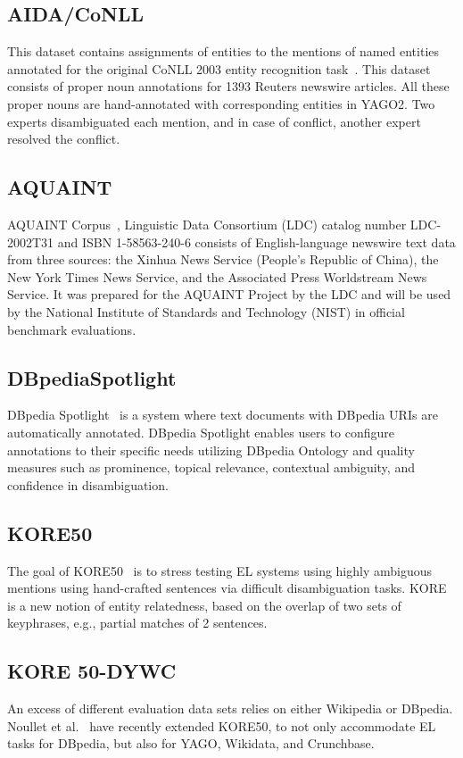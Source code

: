 \documentclass{article}
\begin{document}
\subsection{AIDA/CoNLL}
This dataset contains assignments of entities to the mentions of named entities annotated for the original CoNLL 2003 entity recognition task~\cite{hoffart2011robust}. This dataset consists of proper noun annotations for 1393 Reuters newswire articles. All these proper nouns are hand-annotated with corresponding entities in YAGO2. Two experts disambiguated each mention, and in case of conflict, another expert resolved the conflict.

\subsection{AQUAINT}
AQUAINT Corpus~\cite{crouch2005aquaint}, Linguistic Data Consortium (LDC) catalog number LDC- 2002T31 and ISBN 1-58563-240-6 consists of English-language newswire text data from three sources: the Xinhua News Service (People's Republic of China), the New York Times News Service, and the Associated Press Worldstream News Service. It was prepared for the AQUAINT Project by the LDC and will be used by the National Institute of Standards and Technology (NIST) in official benchmark evaluations.

\subsection{DBpediaSpotlight}
DBpedia Spotlight~\cite{mendes2011dbpedia} is a system where text documents with DBpedia URIs are automatically annotated. DBpedia Spotlight enables users to configure annotations to their specific needs utilizing DBpedia Ontology and quality measures such as prominence, topical relevance, contextual ambiguity, and confidence in disambiguation.

\subsection{KORE50}
The goal of KORE50~\cite{hoffart2012kore} is to stress testing EL systems using highly ambiguous mentions using hand-crafted sentences via difficult disambiguation tasks.
KORE is a new notion of entity relatedness, based on the overlap of two sets of keyphrases, e.g., partial matches of 2 sentences.

\subsection{KORE 50-DYWC}
An excess of different evaluation data sets relies on either Wikipedia or DBpedia. Noullet et al.~\cite{noullet2020kore} have recently extended KORE50, to not only accommodate EL tasks for DBpedia, but also for YAGO, Wikidata, and Crunchbase.
\end{document}
